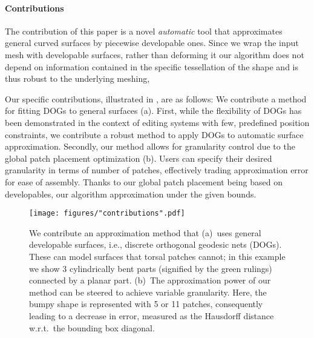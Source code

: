 \paragraph{Contributions}

The contribution of this paper is a novel \emph{automatic} tool that approximates general curved surfaces by piecewise developable ones. Since we wrap the input mesh with developable surfaces, rather than deforming it our algorithm does not depend on information contained in the specific tessellation of the shape and is thus robust to the underlying meshing,  

Our specific contributions, illustrated in , are as follows:
We contribute a method for fitting DOGs to general surfaces (a).
First, while the flexibility of DOGs has been demonstrated in the context of editing systems with few, predefined position constraints, we contribute a robust method to apply DOGs to automatic surface approximation.
%
Secondly, our method allows for granularity control due to the global patch placement optimization (b).
Users can specify their desired granularity in terms of number of patches, effectively trading approximation error for ease of assembly. Thanks to our global patch placement being based on developables, our algorithm 
approximation under the given bounds. 


\begin{figure}[t]
    \texttt{[image: figures/"contributions".pdf]}
    \caption{
    We contribute an approximation method that (a)~uses general developable surfaces, i.e., discrete orthogonal geodesic nets (DOGs). These can model surfaces that torsal patches cannot; in this example we show 3 cylindrically bent parts (signified by the green rulings) connected by a  planar part.
    (b)~The approximation power of our method can be steered to achieve variable granularity. Here, the bumpy shape is represented with 5 or 11 patches, consequently leading to a decrease in error, measured as the Hausdorff distance w.r.t.\ the bounding box diagonal. 
    \label{fig:benefits}}
\end{figure}